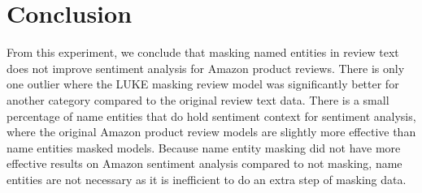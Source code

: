\documentclass[11pt,a4paper]{article}
\begin{document}
\section{Conclusion}

From this experiment, we conclude that masking named entities in review text does not improve sentiment analysis for Amazon product reviews. There is only one outlier where the LUKE masking review model was significantly better for another category compared to the original review text data. There is a small percentage of name entities that do hold sentiment context for sentiment analysis, where the original Amazon product review models are slightly more effective than name entities masked models. Because name entity masking did not have more effective results on Amazon sentiment analysis compared to not masking, name entities are not necessary as it is inefficient to do an extra step of masking data.



\end{document}
